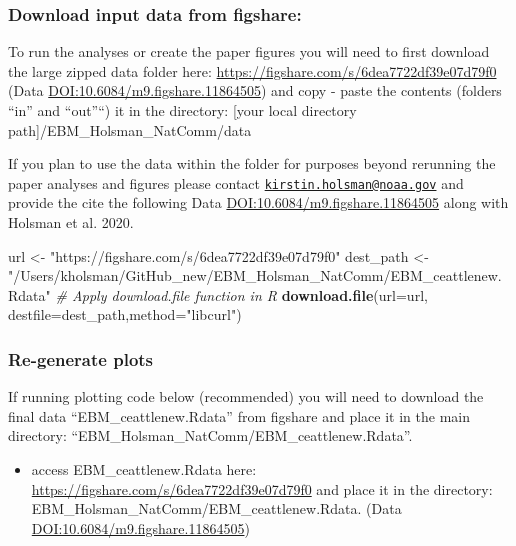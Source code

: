 \documentclass[]{article}
\newenvironment{Shaded}{\begin{snugshade}}{\end{snugshade}}
\newcommand{\KeywordTok}[1]{\textcolor[rgb]{0.13,0.29,0.53}{\textbf{{#1}}}}
\newcommand{\DataTypeTok}[1]{\textcolor[rgb]{0.13,0.29,0.53}{{#1}}}
\newcommand{\StringTok}[1]{\textcolor[rgb]{0.31,0.60,0.02}{{#1}}}
\newcommand{\CommentTok}[1]{\textcolor[rgb]{0.56,0.35,0.01}{\textit{{#1}}}}
\newcommand{\NormalTok}[1]{{#1}}
\providecommand{\tightlist}{%
  \setlength{\itemsep}{0pt}\setlength{\parskip}{0pt}}
\begin{document}
\subsubsection{Download input data from
figshare:}\label{download-input-data-from-figshare}

To run the analyses or create the paper figures you will need to first
download the large zipped data folder here:
\url{https://figshare.com/s/6dea7722df39e07d79f0} (Data
\url{DOI:10.6084/m9.figshare.11864505}) and copy - paste the contents
(folders ``in'' and ``out''``) it in the directory: {[}your local
directory path{]}/EBM\_Holsman\_NatComm/data

If you plan to use the data within the folder for purposes beyond
rerunning the paper analyses and figures please contact
\href{mailto:kirstin.holsman@noaa.gov}{\nolinkurl{kirstin.holsman@noaa.gov}}
and provide the cite the following Data
\url{DOI:10.6084/m9.figshare.11864505} along with Holsman et al. 2020.

\begin{Shaded}
\begin{Highlighting}[]
    \NormalTok{url        <-}\StringTok{ "https://figshare.com/s/6dea7722df39e07d79f0"}
    \NormalTok{dest_path  <-}\StringTok{ "/Users/kholsman/GitHub_new/EBM_Holsman_NatComm/EBM_ceattlenew.Rdata"}
    \CommentTok{# Apply download.file function in R}
    \KeywordTok{download.file}\NormalTok{(}\DataTypeTok{url=}\NormalTok{url, }\DataTypeTok{destfile=}\NormalTok{dest_path,}\DataTypeTok{method=}\StringTok{"libcurl"}\NormalTok{)}
\end{Highlighting}
\end{Shaded}

\subsubsection{Re-generate plots}\label{re-generate-plots}

If running plotting code below (recommended) you will need to download
the final data ``EBM\_ceattlenew.Rdata'' from figshare and place it in
the main directory: ``EBM\_Holsman\_NatComm/EBM\_ceattlenew.Rdata''.

\begin{itemize}
\tightlist
\item
  access EBM\_ceattlenew.Rdata here:
  \url{https://figshare.com/s/6dea7722df39e07d79f0} and place it in the
  directory: EBM\_Holsman\_NatComm/EBM\_ceattlenew.Rdata. (Data
  \url{DOI:10.6084/m9.figshare.11864505})
\end{itemize}
\end{document}
